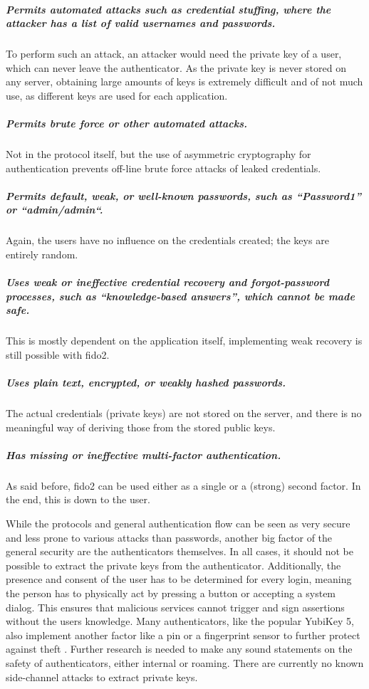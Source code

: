 \noindent\subparagraph{Permits automated attacks such as credential stuffing, where the attacker has a list of valid usernames and passwords.} To perform such an attack, an attacker would need the private key of a user, which can never leave the authenticator. As the private key is never stored on any server, obtaining large amounts of keys is extremely difficult and of not much use, as different keys are used for each application.

\noindent\subparagraph{Permits brute force or other automated attacks.} Not in the protocol itself, but the use of asymmetric cryptography for authentication prevents off-line brute force attacks of leaked credentials.

\noindent\subparagraph{Permits default, weak, or well-known passwords, such as “Password1” or “admin/admin“.} Again, the users have no influence on the credentials created; the keys are entirely random.

\noindent\subparagraph{Uses weak or ineffective credential recovery and forgot-password processes, such as “knowledge-based answers”, which cannot be made safe.} This is mostly dependent on the application itself, implementing weak recovery is still possible with \ac{fido2}.

\noindent\subparagraph{Uses plain text, encrypted, or weakly hashed passwords.} The actual credentials (private keys) are not stored on the server, and there is no meaningful way of deriving those from the stored public keys.

\noindent\subparagraph{Has missing or ineffective multi-factor authentication.} As said before, \ac{fido2} can be used either as a single or a (strong) second factor. In the end, this is down to the user.

\noindent While the protocols and general authentication flow can be seen as very secure and less prone to various attacks than passwords, another big factor of the general security are the authenticators themselves. In all cases, it should not be possible to extract the private keys from the authenticator. Additionally, the presence and consent of the user has to be determined for every login, meaning the person has to physically act by pressing a button or accepting a system dialog. This ensures that malicious services cannot trigger and sign assertions without the users knowledge. Many authenticators, like the popular YubiKey 5, also implement another factor like a \ac{pin} or a fingerprint sensor to further protect against theft \cite{yubikey_5_nfc,dunkelberger2018}.
Further research is needed to make any sound statements on the safety of authenticators, either internal or roaming. There are currently no known side-channel attacks to extract private keys.\\


